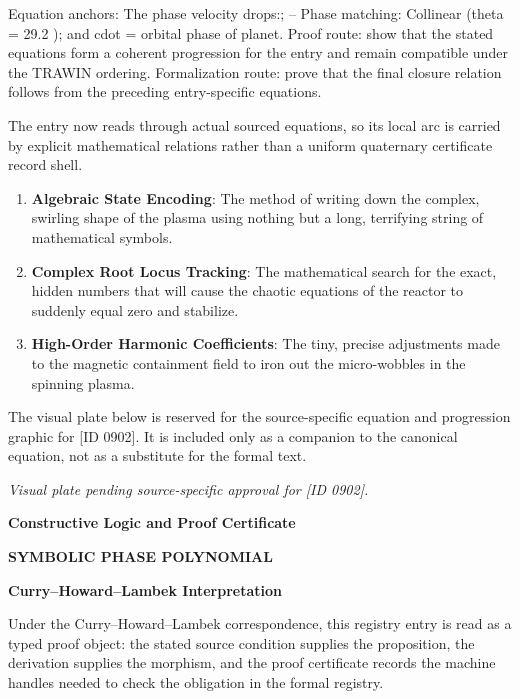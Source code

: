 Equation anchors: The phase velocity drops:; -- Phase matching: Collinear (theta = 29.2 ); and cdot = orbital phase of planet. Proof route: show that the stated equations form a coherent progression for the entry and remain compatible under the TRAWIN ordering. Formalization route: prove that the final closure relation follows from the preceding entry-specific equations.

The entry now reads through actual sourced equations, so its local arc is carried by explicit mathematical relations rather than a uniform quaternary certificate record shell.
\endgroup

\begin{enumerate}[leftmargin=1.6em,itemsep=6pt,topsep=4pt]
\item \textbf{Algebraic State Encoding}: The method of writing down the complex, swirling shape of the plasma using nothing but a long, terrifying string of mathematical symbols.
\item \textbf{Complex Root Locus Tracking}: The mathematical search for the exact, hidden numbers that will cause the chaotic equations of the reactor to suddenly equal zero and stabilize.
\item \textbf{High-Order Harmonic Coefficients}: The tiny, precise adjustments made to the magnetic containment field to iron out the micro-wobbles in the spinning plasma.
\end{enumerate}

\begingroup\footnotesize\sloppy
The visual plate below is reserved for the source-specific equation and progression graphic for [ID 0902]. It is included only as a companion to the canonical equation, not as a substitute for the formal text.
\par\endgroup
\begingroup\footnotesize\itshape
Visual plate pending source-specific approval for [ID 0902].
\par\endgroup

\clearpage
\begingroup\tzpsupportsetup
\noindent\textbf{\fontsize{10.8pt}{12.8pt}\selectfont [ID 0902] Constructive Logic and Proof Certificate}\par
\noindent\textbf{\fontsize{10pt}{12pt}\selectfont SYMBOLIC PHASE POLYNOMIAL}\par
\vspace{0.45em}
\begingroup
\footnotesize
\setlength{\parskip}{0.22em}
\setlength{\parindent}{0pt}
\noindent\textbf{Curry--Howard--Lambek Interpretation}\par
Under the Curry--Howard--Lambek correspondence, this registry entry is read as a typed proof
object: the stated source condition supplies the proposition, the derivation supplies the
morphism, and the proof certificate records the machine handles needed to check the obligation
in the formal registry.

